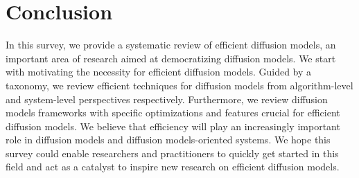 \section{Conclusion}
In this survey, we provide a systematic review of efficient diffusion models, an important area of research aimed at democratizing diffusion models.
%
We start with motivating the necessity for efficient diffusion models. Guided by a taxonomy, we review efficient techniques for diffusion models from algorithm-level and system-level perspectives respectively.
%
Furthermore, we review diffusion models frameworks with specific optimizations and features crucial for efficient diffusion models.
%
We believe that efficiency will play an increasingly important role in diffusion models and diffusion models-oriented systems. 
%
We hope this survey could enable researchers and practitioners to quickly get started in this field and act as a catalyst to inspire new research on efficient diffusion models.